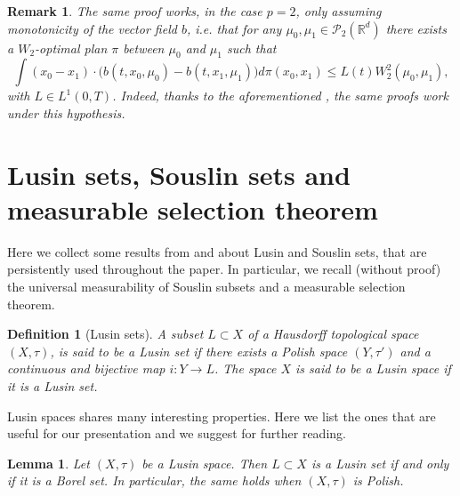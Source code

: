 \documentclass[10pt,leqno]{amsart}
\numberwithin{equation}{section}
\newtheorem{lemma}[teorema]{Lemma}
\newtheorem{df}[teorema]{Definition}
\newtheorem{oss}[teorema]{Remark}
\newcommand{\R}{\mathbb{R}}
\newcommand{\PP}{\mathcal{P}}
\begin{document}
    \begin{oss}
        The same proof works, in the case $p=2$, only assuming monotonicity of the vector field $b$, i.e. that for any $\mu_0,\mu_1 \in \PP_2(\R^d)$ there exists a $W_2$-optimal plan $\pi$ between $\mu_0$ and $\mu_1$ such that 
        \begin{equation}
            \int (x_0-x_1)\cdot \big( b(t,x_0,\mu_0) - b(t,x_1,\mu_1) \big) d\pi(x_0,x_1) \leq L(t) W_2^2(\mu_0,\mu_1),
        \end{equation}
        with $L\in L^1(0,T)$. Indeed, thanks to the aforementioned \cite{cavagnari2023lagrangian,cavagnari2020extension}, the same proofs work under this hypothesis.
    \end{oss}

    









%
\appendix


\section{Lusin sets, Souslin sets and measurable selection theorem}\label{appendix souslin}
Here we collect some results from \cite{schwariz1973radon} and \cite{Bogachev07} about Lusin and Souslin sets, that are persistently used throughout the paper. In particular, we recall (without proof) the universal measurability of Souslin subsets and a measurable selection theorem.

\begin{df}[Lusin sets]\label{def: lusin}
    A subset $L\subset X$ of a Hausdorff topological space $(X,\tau)$, is said to be a Lusin set if there exists a Polish space $(Y,\tau')$ and a continuous and bijective map $i:Y\to L$. The space $X$ is said to be a Lusin space if it is a Lusin set.
\end{df}

Lusin spaces shares many interesting properties. Here we list the ones that are useful for our presentation and we suggest \cite[Chapter 2]{schwariz1973radon} for further reading.

\begin{lemma}\label{lusin iff borel}
    Let $(X,\tau)$ be a Lusin space. Then $L\subset X$ is a Lusin set if and only if it is a Borel set. In particular, the same holds when $(X,\tau)$ is Polish.
\end{lemma}
\end{document}
